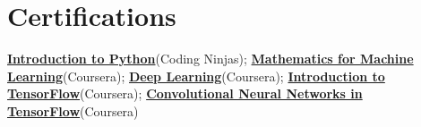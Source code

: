 \documentclass[a4paper]{article}
\newcommand{\resumeItem}[2]{
	\item\small{
		\textbf{#1}{ #2 \vspace{-5pt}}
	}
}
\newcommand{\resumeSubItem}[2]{\resumeItem{#1}{#2}\vspace{0pt}}
\newcommand{\resumeSubHeadingListStart}{\begin{itemize}[leftmargin=*]}
\newcommand{\resumeSubHeadingListEnd}{\end{itemize}}
\begin{document}



\section{Certifications}

\justifying

{\href{https://students.codingninjas.com/verify/0e0427a922f32cf0}{{\textbf{Introduction to Python}}}(Coding Ninjas)}; {\href{https://www.coursera.org/account/accomplishments/certificate/PERFF99LL8T7}{\textbf{Mathematics for Machine Learning}}(Coursera)}; {\href{https://www.coursera.org/account/accomplishments/certificate/KJBZ3XKKYAXM}{\textbf{Deep Learning}}(Coursera)}; {\href{https://www.coursera.org/account/accomplishments/certificate/7G4V3W8T4J7L}{\textbf{Introduction to TensorFlow}}(Coursera)}; {\href{https://www.coursera.org/account/accomplishments/certificate/HHUQBSMH53JY}{\textbf{Convolutional Neural Networks in TensorFlow}}(Coursera)}
\end{document}
